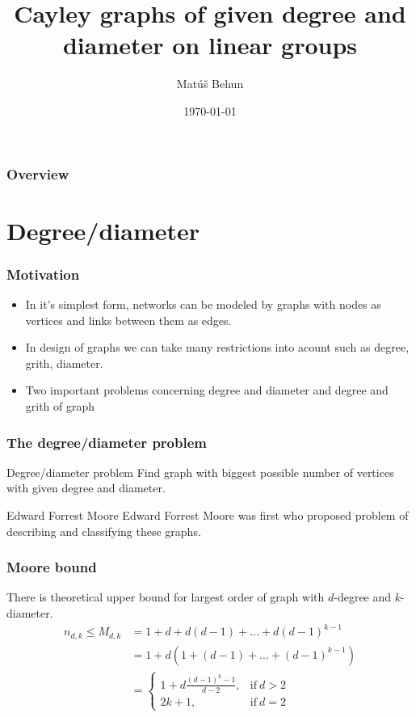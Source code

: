 \documentclass{beamer}
\title[]{Cayley graphs of given degree and diameter on linear groups} %
\author{Mat\'u\v{s} Behun} %
\institute[UCLA] %
{
Slovak University of Technology in Bratislava \\ %
\medskip
}
\date{\today} %
\begin{document}
\begin{frame}
\titlepage 
\end{frame}
\begin{frame}
\frametitle{Overview}
\tableofcontents
\end{frame}
\section{Degree/diameter} 
\begin{frame}
	\frametitle{Motivation}
\begin{itemize}
    \item In it's simplest form, networks can be modeled by graphs with nodes as vertices and links between them as edges.
	\item In design of graphs we can take many restrictions into acount such as degree, grith, diameter.
	\item Two important problems concerning degree and diameter and degree and grith of graph
\end{itemize}
\end{frame}
\begin{frame}
\frametitle{The degree/diameter problem}
	\begin{block}{Degree/diameter problem}
		Find graph with biggest possible number of vertices with given degree and diameter.
	\end{block}
	\begin{block}{Edward Forrest Moore}
		Edward Forrest Moore was first who proposed problem of describing and classifying these graphs.
	\end{block}
\end{frame}
\begin{frame}
	\frametitle{Moore bound}
	There is theoretical upper bound for largest order of graph with $d$-degree and $k$-diameter.
	\begin{equation}\label{eq:Moore}
		\begin{split}
			n_{d,k} \leq M_{d,k}    & = 1 + d + d(d - 1) + \dots + d(d - 1)^{k-1}  \\
									& = 1 + d(1 + (d - 1) + \dots + (d - 1)^{k-1}) \\
									& = \begin{cases}
											1+d\frac{(d-1)^{k}-1}{d-2}, & \text{if}\ d > 2 \\
											2k+1, & \text{if}\ d=2
										\end{cases}
		\end{split}
	\end{equation}
\end{frame}
\end{document}
